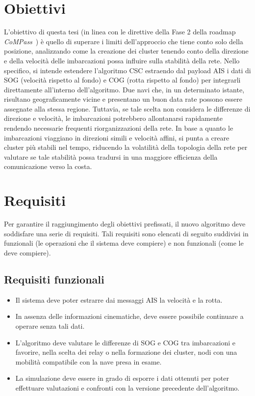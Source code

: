 \section{Obiettivi}
\label{sec:obiettivi}

L'obiettivo di questa tesi (in linea con le direttive della Fase 2 della roadmap \emph{CoMPass}~\cite{roadmap}) è quello di superare i limiti dell'approccio che tiene conto solo della posizione, analizzando come la creazione dei cluster tenendo conto della direzione e della velocità delle imbarcazioni possa influire sulla stabilità della rete. Nello specifico, si intende estendere l'algoritmo \ac{CSC} estraendo dal payload \ac{AIS} i dati di \ac{SOG} (velocità rispetto al fondo) e \ac{COG} (rotta rispetto al fondo) per integrarli direttamente all'interno dell'algoritmo. Due navi che, in un determinato istante, risultano geograficamente vicine e presentano un buon data rate possono essere assegnate alla stessa regione. Tuttavia, se tale scelta non considera le differenze di direzione e velocità, le imbarcazioni potrebbero allontanarsi rapidamente rendendo necessarie frequenti riorganizzazioni della rete. In base a quanto le imbarcazioni viaggiano in direzioni simili e velocità affini, si punta a creare cluster più stabili nel tempo, riducendo la volatilità della topologia della rete per valutare se tale stabilità possa tradursi in una maggiore efficienza della comunicazione verso la costa.
\section{Requisiti}
\label{sec:requisiti}

Per garantire il raggiungimento degli obiettivi prefissati, il nuovo algoritmo deve soddisfare una serie di requisiti. Tali requisiti sono elencati di seguito suddivisi in funzionali (le operazioni che il sistema deve compiere) e non funzionali (come le deve compiere).

\subsection{Requisiti funzionali}
\label{sec:requisiti_funzionali}

\begin{itemize}
    \item Il sistema deve poter estrarre dai messaggi \ac{AIS} la velocità e la rotta.
    \item In assenza delle informazioni cinematiche, deve essere possibile continuare a operare senza tali dati.
    \item L'algoritmo deve valutare le differenze di \ac{SOG} e \ac{COG} tra imbarcazioni e favorire, nella scelta dei relay o nella formazione dei cluster, nodi con una mobilità compatibile con la nave presa in esame.
    \item La simulazione deve essere in grado di esporre i dati ottenuti per poter effettuare valutazioni e confronti con la versione precedente dell'algoritmo.
\end{itemize}

